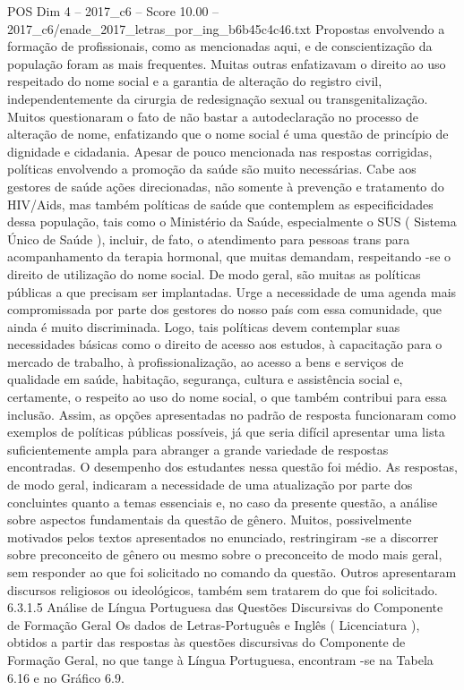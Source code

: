 \begin{textsample}{POS Dim 4 – 2017\_c6 – Score 10.00 – 2017\_c6/enade\_2017\_letras\_por\_ing\_b6b45c4c46.txt}
Propostas envolvendo a formação de profissionais, como as mencionadas aqui, e de conscientização da população foram as mais frequentes.
Muitas outras enfatizavam o direito ao uso respeitado do nome social e a garantia de alteração do registro civil, independentemente da cirurgia de redesignação sexual ou transgenitalização.
Muitos questionaram o fato de não bastar a autodeclaração no processo de alteração de nome, enfatizando que o nome social é uma questão de princípio de dignidade e cidadania.
Apesar de pouco mencionada nas respostas corrigidas, políticas envolvendo a promoção da saúde são muito necessárias.
Cabe aos gestores de saúde ações direcionadas, não somente à prevenção e tratamento do HIV/Aids, mas também políticas de saúde que contemplem as especificidades dessa população, tais como o Ministério da Saúde, especialmente o SUS ( Sistema Único de Saúde ), incluir, de fato, o atendimento para pessoas trans para acompanhamento da terapia hormonal, que muitas demandam, respeitando -se o direito de utilização do nome social.
De modo geral, são muitas as políticas públicas a que precisam ser implantadas.
Urge a necessidade de uma agenda mais compromissada por parte dos gestores do nosso país com essa comunidade, que ainda é muito discriminada.
Logo, tais políticas devem contemplar suas necessidades básicas como o direito de acesso aos estudos, à capacitação para o mercado de trabalho, à profissionalização, ao acesso a bens e serviços de qualidade em saúde, habitação, segurança, cultura e assistência social e, certamente, o respeito ao uso do nome social, o que também contribui para essa inclusão.
Assim, as opções apresentadas no padrão de resposta funcionaram como exemplos de políticas públicas possíveis, já que seria difícil apresentar uma lista suficientemente ampla para abranger a grande variedade de respostas encontradas.
O desempenho dos estudantes nessa questão foi médio.
As respostas, de modo geral, indicaram a necessidade de uma atualização por parte dos concluintes quanto a temas essenciais e, no caso da presente questão, a análise sobre aspectos fundamentais da questão de gênero.
Muitos, possivelmente motivados pelos textos apresentados no enunciado, restringiram -se a discorrer sobre preconceito de gênero ou mesmo sobre o preconceito de modo mais geral, sem responder ao que foi solicitado no comando da questão.
Outros apresentaram discursos religiosos ou ideológicos, também sem tratarem do que foi solicitado. 6.3.1.5 Análise de Língua Portuguesa das Questões Discursivas do Componente de Formação Geral Os dados de Letras-Português e Inglês ( Licenciatura ), obtidos a partir das respostas às questões discursivas do Componente de Formação Geral, no que tange à Língua Portuguesa, encontram -se na Tabela 6.16 e no Gráfico 6.9.

\end{textsample}

